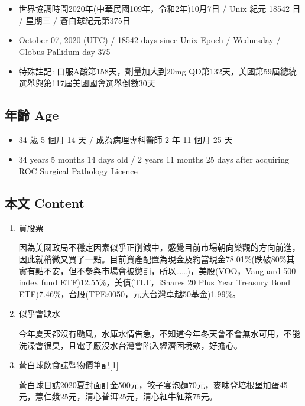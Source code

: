 \documentclass[a5paper, 11pt
]{book}
\providecommand{\tightlist}{%
  \setlength{\itemsep}{0pt}\setlength{\parskip}{0pt}}
\begin{document}
\begin{itemize}
\tightlist
\item
  世界協調時間2020年(中華民國109年，令和2年)10月7日 / Unix 紀元 18542 日
  / 星期三 / 蒼白球紀元第375日
\item
  October 07, 2020 (UTC) / 18542 days since Unix Epoch / Wednesday /
  Globus Pallidum day 375
\item
  特殊註記: 口服A酸第158天，劑量加大到20mg
  QD第132天，美國第59屆總統選舉與第117屆美國國會選舉倒數30天
\end{itemize}

\hypertarget{ux5e74ux9f61-age-34}{%
\subsection{年齡 Age}\label{ux5e74ux9f61-age-34}}

\begin{itemize}
\tightlist
\item
  34 歲 5 個月 14 天 / 成為病理專科醫師 2 年 11 個月 25 天
\item
  34 years 5 months 14 days old / 2 years 11 months 25 days after
  acquiring ROC Surgical Pathology Licence
\end{itemize}

\hypertarget{ux672cux6587-content-34}{%
\subsection{本文 Content}\label{ux672cux6587-content-34}}

\begin{enumerate}
\def\labelenumi{\arabic{enumi}.}
\item
  買股票

  因為美國政局不穩定因素似乎正削減中，感覺目前市場朝向樂觀的方向前進，因此就稍微又買了一點。目前資產配置為現金及約當現金78.01\%(跌破80\%其實有點不安，但不參與市場會被懲罰，所以\ldots\ldots)，美股(VOO，Vanguard
  500 index fund ETF)12.55\%，美債(TLT，iShares 20 Plus Year Treasury
  Bond ETF)7.46\%，台股(TPE:0050，元大台灣卓越50基金)1.99\%。
\item
  似乎會缺水

  今年夏天都沒有颱風，水庫水情告急，不知道今年冬天會不會無水可用，不能洗澡會很臭，且電子廠沒水台灣會陷入經濟困境欸，好擔心。
\item
  蒼白球飲食誌暨物價筆記{[}1{]}

  蒼白球日誌2020夏封面訂金500元，餃子宴泡麵70元，麥味登培根堡加蛋45元，薏仁漿25元，清心普洱25元，清心紅牛紅茶75元。
\end{enumerate}
\end{document}
